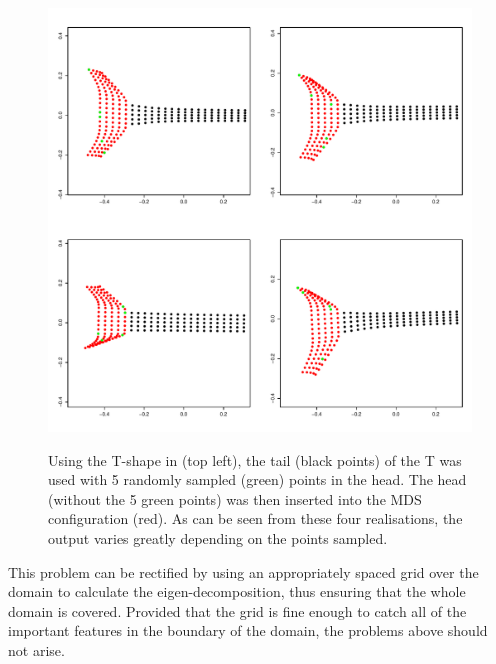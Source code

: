 \begin{figure}
\centering
\includegraphics[width=6in]{mds/figs/tshaperand.pdf} \\
\caption{Using the T-shape in  (top left), the tail (black points) of the T was used with 5 randomly sampled (green) points in the head. The head (without the 5 green points) was then inserted into the MDS configuration (red). As can be seen from these four realisations, the output varies greatly depending on the points sampled.}
\label{tshaperand}
\end{figure}

This problem can be rectified by using an appropriately spaced grid over the domain to calculate the eigen-decomposition, thus ensuring that the whole domain is covered. Provided that the grid is fine enough to catch all of the important features in the boundary of the domain, the problems above should not arise.

